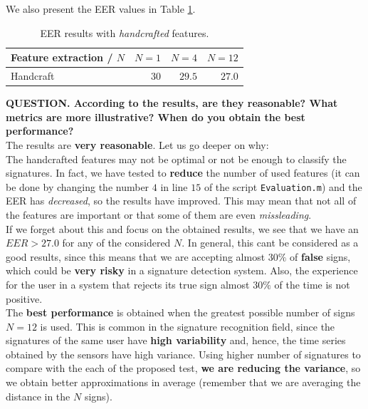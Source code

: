 \documentclass[a4paper]{article}
\def\inline{\lstinline[basicstyle=\ttfamily,keywordstyle={}]}
\begin{document}
{We also present the EER values in Table \ref{table:res:HAND}.

\begin{table}[H]
  \centering
\begin{tabular}{l|rrr}
Feature extraction / $N$ & $N = 1$ & $N=4$  & $N = 12$ \\ \hline
Handcraft                & $30$    & $29.5$ & $27.0$  
\end{tabular}
\caption{EER results with \emph{handcrafted} features.}
\label{table:res:HAND}
\end{table}



\textbf{QUESTION. According to the results, are they reasonable? What metrics are more illustrative? When do you obtain the best performance?}\\

The results are \textbf{very reasonable}. Let us go deeper on why: \\

The handcrafted features may not be optimal or not be enough to classify the signatures. In fact, we have tested to \textbf{reduce} the number of used features (it can be done by changing the number \(4\) in line \(15\) of the script \inline{Evaluation.m}) and the EER has \emph{decreased}, so the results have improved. This may mean that not all of the features are important or that some of them are even \emph{missleading}.\\

If we forget about this and focus on the obtained results, we see that we have an \(EER > 27.0\) for any of the considered \(N\). In general, this cant be considered as a good results, since this means that we are accepting almost \(30\%\) of \textbf{false} signs, which could be \textbf{very risky} in a signature detection system. Also, the experience for the user in a system that rejects its true sign almost \(30\%\) of the time is not positive.\\

The \textbf{best performance} is obtained when the greatest possible number of signs \(N=12\) is used. This is common in the signature recognition field, since the signatures of the same user have \textbf{high variability} and, hence, the time series obtained by the sensors have high variance. Using higher number of signatures to compare with the each of the proposed test, \textbf{we are reducing the variance}, so we obtain better approximations in average (remember that we are averaging the distance in the \(N\) signs).

}
\end{document}
